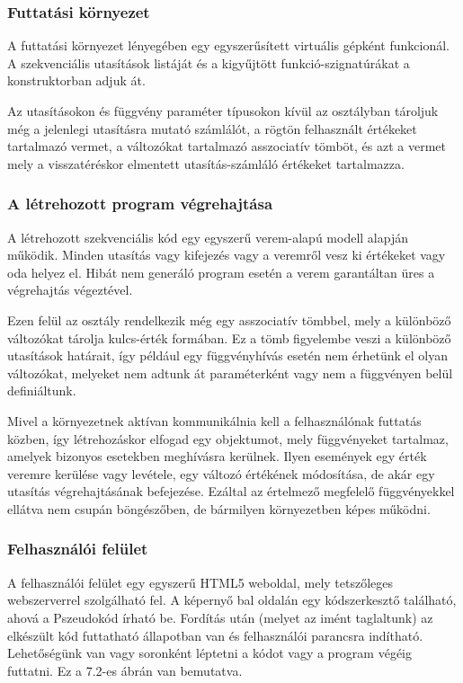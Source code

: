 \subsubsection{Futtatási környezet}

A futtatási környezet lényegében egy egyszerűsített virtuális gépként funkcionál. A szekvenciális utasítások listáját és a kigyűjtött funkció-szignatúrákat a konstruktorban adjuk át.

Az utasításokon és függvény paraméter típusokon kívül az osztályban tároljuk még a jelenlegi utasításra mutató számlálót, a rögtön felhasznált értékeket tartalmazó vermet, a változókat tartalmazó asszociatív tömböt, és azt a vermet mely a visszatéréskor elmentett utasítás-számláló értékeket tartalmazza.

\subsubsection{A létrehozott program végrehajtása}

A létrehozott szekvenciális kód egy egyszerű verem-alapú modell alapján működik. Minden utasítás vagy kifejezés vagy a veremről vesz ki értékeket vagy oda helyez el. Hibát nem generáló program esetén a verem garantáltan üres a végrehajtás végeztével.

Ezen felül az osztály rendelkezik még egy asszociatív tömbbel, mely a különböző változókat tárolja kulcs-érték formában. Ez a tömb figyelembe veszi a különböző utasítások határait, így például egy függvényhívás esetén nem érhetünk el olyan változókat, melyeket nem adtunk át paraméterként vagy nem a függvényen belül definiáltunk.

Mivel a környezetnek aktívan kommunikálnia kell a felhasználónak futtatás közben, így létrehozáskor elfogad egy objektumot, mely függvényeket tartalmaz, amelyek bizonyos esetekben meghívásra kerülnek. Ilyen események egy érték veremre kerülése vagy levétele, egy változó értékének módosítása, de akár egy utasítás végrehajtásának befejezése. Ezáltal az értelmező megfelelő függvényekkel ellátva nem csupán böngészőben, de bármilyen környezetben képes működni.

\subsubsection{Felhasználói felület}

A felhasználói felület egy egyszerű HTML5 weboldal, mely tetszőleges webszerverrel szolgálható fel. A képernyő bal oldalán egy kódszerkesztő található, ahová a Pszeudokód írható be. Fordítás után (melyet az imént taglaltunk) az elkészült kód futtatható állapotban van és felhasználói parancsra indítható. Lehetőségünk van vagy soronként léptetni a kódot vagy a program végéig futtatni. Ez a 7.2-es ábrán van bemutatva.

